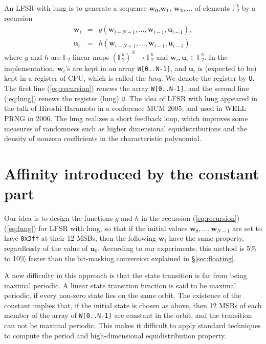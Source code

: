 \documentclass{svmult}
\begin{document}
An LFSR with lung is to generate a sequence
$\mathbf{w_0}$,$\mathbf{w_1}$, $\mathbf{w_2},...$ of elements
${\mathbb F}_2^b$ by a recursion
\begin{eqnarray}
  \mathbf{w}_i &=& g(\mathbf{w}_{i-N+1}, ..., \mathbf{w}_{i-1},
  \mathbf{u}_{i-1}), \label{eq:recursion} \\
  \mathbf{u}_i &=& h(\mathbf{w}_{i-N+1}, ..., \mathbf{w}_{i-1},
  \mathbf{u}_{i-1}). \label{eq:lung}
\end{eqnarray}
where $g$ and $h$ are ${\mathbb F}_2$-linear maps $({\mathbb F}_2^{b})^N \rightarrow
{\mathbb F}_2^b$ and $\mathbf{w}_i, \mathbf{u}_i \in {\mathbb F}_2^b$.  In the
implementation, $\mathbf{w}_i$'s are kept in an array
\texttt{W[0..N-1]}, and $\mathbf{u}_i$
is (expected to be) kept in a register of
CPU, which is called the {\em lung}. We denote the register
by \texttt{U}. The first line (\ref{eq:recursion})
renews the array \texttt{W[0..N-1]}, and the second line (\ref{eq:lung}) renews
the register (lung) \texttt{U}.
The idea of LFSR with lung appeared in the talk of Hiroshi
Haramoto in a conference MCM 2005, and used in WELL PRNG \cite{WELL} in 2006.
The lung realizes a short feedback loop, which improves
some measures of randomness such as higher dimensional 
equidistributions and the density of nonzero coefficients
in the characteristic polynomial.

\section{Affinity introduced by the constant part}\label{sec:affine}
Our idea is to design the functions $g$ and $h$ in 
the recursion (\ref{eq:recursion})
(\ref{eq:lung}) for LFSR with lung, so that if the initial 
values $\mathbf{w}_0, \ldots, \mathbf{w}_{N-1}$ are set to 
have \texttt{0x3ff} at their 12 MSBs, then the following 
$\mathbf{w}_i$ have the same property, regardlessly of 
the value of $\mathbf{u}_0$. According to our experiments, 
this method is 5\% to 10\% faster than the bit-masking
conversion explained in \S\ref{sec:floating}. 

A new difficulty in this approach is that 
the state transition is far from being maximal periodic.
A linear state transition function is said to be
maximal periodic, if every non-zero state lies on
the same orbit. The existence of the constant implies that, if 
the initial state is chosen as above, then 12 MSBs 
of each member of the array of \texttt{W[0..N-1]}
are constant in the orbit, and the transition can not be
maximal periodic. This makes it difficult to apply
standard techniques to compute the period and
high-dimensional equidistribution property.
\end{document}
